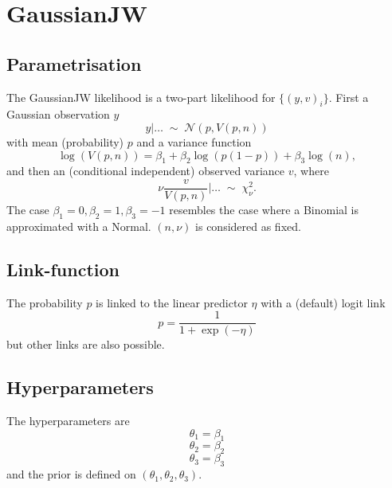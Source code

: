 \documentclass[a4paper,11pt]{article}
\begin{document}
\section*{GaussianJW}

\subsection*{Parametrisation}

The GaussianJW likelihood is a two-part likelihood for $\{(y,v)_i\}$.
First a Gaussian observation $y$
\begin{displaymath}
    y|\ldots  \;\sim\; {\mathcal N}(p, V(p, n)) 
\end{displaymath}
with mean (probability) $p$ and a variance function
\begin{displaymath}
    \log(V(p, n)) = \beta_1 + \beta_2 \log(p(1-p)) + \beta_3 \log(n),
\end{displaymath}
and then an (conditional independent) observed variance $v$, where
\begin{displaymath}
    \nu\frac{v}{V(p,n)}|\ldots \;\sim\; \chi^{2}_{\nu}.
\end{displaymath}
The case $\beta_1=0, \beta_2=1, \beta_3=-1$ resembles the case where a
Binomial is approximated with a Normal. $(n,\nu)$ is considered as
fixed.


\subsection*{Link-function}

The probability $p$ is linked to the linear predictor $\eta$ with a
(default) logit link
\begin{displaymath}
    p = \frac{1}{1 + \exp(-\eta)}
\end{displaymath}
but other links are also possible.

\subsection*{Hyperparameters}

The hyperparameters are 
\begin{displaymath}
    \theta_1 = \beta_1
\end{displaymath}
\begin{displaymath}
    \theta_2 = \beta_2
\end{displaymath}
\begin{displaymath}
    \theta_3 = \beta_3
\end{displaymath}
and the prior is defined on $(\theta_1, \theta_2, \theta_3)$.
\end{document}
